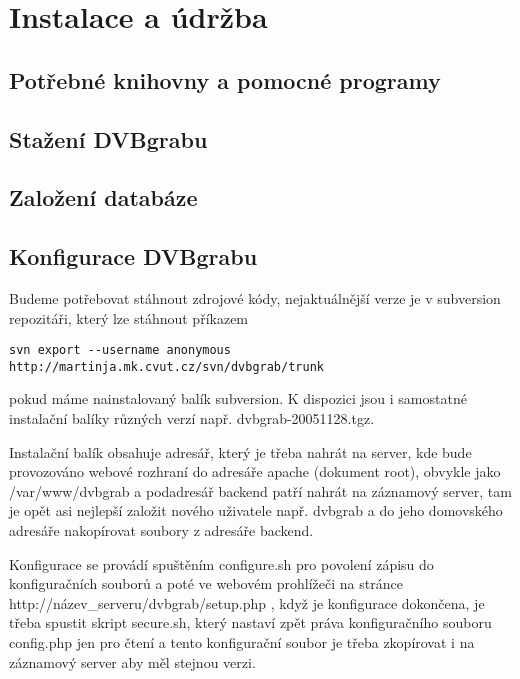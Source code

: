 \chapter{Instalace a údržba}

\section{Potřebné knihovny a pomocné programy}
\section{Stažení DVBgrabu}
\section{Založení databáze}
\section{Konfigurace DVBgrabu}

Budeme potřebovat stáhnout zdrojové kódy, nejaktuálnější verze je v subversion repozitáři, který lze stáhnout příkazem
\begin{small}\begin{verbatim}svn export --username anonymous http://martinja.mk.cvut.cz/svn/dvbgrab/trunk\end{verbatim}\end{small}
pokud máme nainstalovaný balík subversion.
K dispozici jsou i samostatné instalační balíky různých verzí např. dvbgrab-20051128.tgz.

\vspace{10pt}

Instalační balík obsahuje adresář, který je třeba nahrát na server, kde bude provozováno webové rozhraní do adresáře apache (dokument root), obvykle jako /var/www/dvbgrab a podadresář backend patří nahrát na záznamový server, tam je opět asi nejlepší založit nového uživatele např. dvbgrab a do jeho domovského adresáře nakopírovat soubory z adresáře backend.

\vspace{10pt}

Konfigurace se provádí spuštěním configure.sh pro povolení zápisu do konfiguračních souborů a poté ve webovém prohlížeči na stránce http://název\_serveru/dvbgrab/setup.php , když je konfigurace dokončena, je třeba spustit skript secure.sh, který nastaví zpět práva konfiguračního souboru config.php jen pro čtení a tento konfigurační soubor je třeba zkopírovat i na záznamový server aby měl stejnou verzi.

